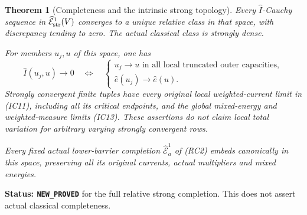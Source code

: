 \documentclass[11pt,a4paper]{article}
\numberwithin{equation}{section}
\newtheorem{theorem}{Theorem}[section]
\theoremstyle{definition}
\theoremstyle{remark}
\begin{document}
\begin{theorem}[Completeness and the intrinsic strong topology]
\label{thm:r11-complete-strong-first-energy-space}
Every $\widehat I$-Cauchy sequence in
$\widehat{\mathcal E}^1_{\rm str}(V)$ converges to a unique
relative class in that space, with discrepancy tending to zero.
The actual classical class is strongly dense.

For members $u_j,u$ of this space, one has
\[
 \widehat I(u_j,u)\longrightarrow0
 \quad\Longleftrightarrow\quad
 \left\{
 \begin{array}{l}
 u_j\longrightarrow u\text{ in all local truncated outer capacities},\\
 \widehat e(u_j)\longrightarrow\widehat e(u).
 \end{array}\right.
 \tag{IC20}
\]
Strongly convergent finite tuples have every original local
weighted-current limit in (IC11), including all its critical
endpoints, and the global mixed-energy and weighted-measure
limits (IC13). These assertions do not claim local total
variation for arbitrary varying strongly convergent rows.

Every fixed actual lower-barrier completion
$\widehat{\mathcal E}^1_a$ of (RC2) embeds canonically in this
space, preserving all its original currents, actual multipliers
and mixed energies.
\end{theorem}

\noindent\textbf{Status: \texttt{NEW\_PROVED}} for the full relative
strong completion. This does not assert actual classical
completeness.
\end{document}
